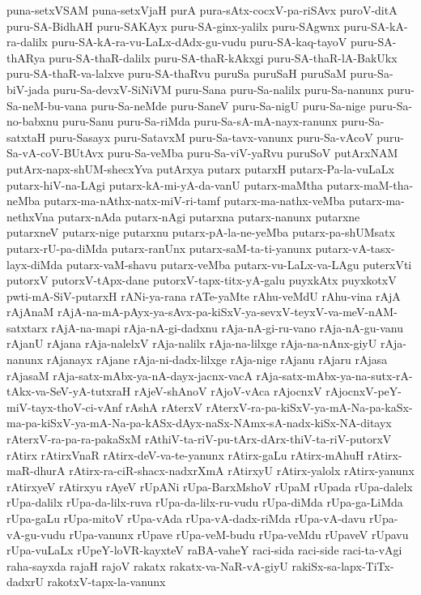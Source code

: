 {puna-setxVSAM
puna-setxVjaH
purA
pura-sAtx-cocxV-pa-riSAvx
puroV-ditA
puru-SA-BidhAH
puru-SAKAyx
puru-SA-ginx-yalilx
puru-SAgwnx
puru-SA-kA-ra-dalilx
puru-SA-kA-ra-vu-LaLx-dAdx-gu-vudu
puru-SA-kaq-tayoV
puru-SA-thARya
puru-SA-thaR-dalilx
puru-SA-thaR-kAkxgi
puru-SA-thaR-lA-BakUkx
puru-SA-thaR-va-lalxve
puru-SA-thaRvu
puruSa
puruSaH
puruSaM
puru-Sa-biV-jada
puru-Sa-devxV-SiNiVM
puru-Sana
puru-Sa-nalilx
puru-Sa-nanunx
puru-Sa-neM-bu-vana
puru-Sa-neMde
puru-SaneV
puru-Sa-nigU
puru-Sa-nige
puru-Sa-no-babxnu
puru-Sanu
puru-Sa-riMda
puru-Sa-sA-mA-nayx-ranunx
puru-Sa-satxtaH
puru-Sasayx
puru-SatavxM
puru-Sa-tavx-vanunx
puru-Sa-vAcoV
puru-Sa-vA-coV-BUtAvx
puru-Sa-veMba
puru-Sa-viV-yaRvu
puruSoV
putArxNAM
putArx-napx-shUM-shecxYva
putArxya
putarx
putarxH
putarx-Pa-la-vuLaLx
putarx-hiV-na-LAgi
putarx-kA-mi-yA-da-vanU
putarx-maMtha
putarx-maM-tha-neMba
putarx-ma-nAthx-natx-miV-ri-tamf
putarx-ma-nathx-veMba
putarx-ma-nethxVna
putarx-nAda
putarx-nAgi
putarxna
putarx-nanunx
putarxne
putarxneV
putarx-nige
putarxnu
putarx-pA-la-ne-yeMba
putarx-pa-shUMsatx
putarx-rU-pa-diMda
putarx-ranUnx
putarx-saM-ta-ti-yanunx
putarx-vA-tasx-layx-diMda
putarx-vaM-shavu
putarx-veMba
putarx-vu-LaLx-va-LAgu
puterxVti
putorxV
putorxV-tApx-dane
putorxV-tapx-titx-yA-galu
puyxkAtx
puyxkotxV
pwti-mA-SiV-putarxH
rANi-ya-rana
rATe-yaMte
rAhu-veMdU
rAhu-vina
rAjA
rAjAnaM
rAjA-na-mA-pAyx-ya-sAvx-pa-kiSxV-ya-sevxV-teyxV-va-meV-nAM-satxtarx
rAjA-na-mapi
rAja-nA-gi-dadxnu
rAja-nA-gi-ru-vano
rAja-nA-gu-vanu
rAjanU
rAjana
rAja-nalelxV
rAja-nalilx
rAja-na-lilxge
rAja-na-nAnx-giyU
rAja-nanunx
rAjanayx
rAjane
rAja-ni-dadx-lilxge
rAja-nige
rAjanu
rAjaru
rAjasa
rAjasaM
rAja-satx-mAbx-ya-nA-dayx-jacnx-vacA
rAja-satx-mAbx-ya-na-sutx-rA-tAkx-va-SeV-yA-tutxraH
rAjeV-shAnoV
rAjoV-vAca
rAjocnxV
rAjocnxV-peY-miV-tayx-thoV-ci-vAnf
rAshA
rAterxV
rAterxV-ra-pa-kiSxV-ya-mA-Na-pa-kaSx-ma-pa-kiSxV-ya-mA-Na-pa-kASx-dAyx-naSx-NAmx-sA-nadx-kiSx-NA-ditayx
rAterxV-ra-pa-ra-pakaSxM
rAthiV-ta-riV-pu-tArx-dArx-thiV-ta-riV-putorxV
rAtirx
rAtirxVnaR
rAtirx-deV-va-te-yanunx
rAtirx-gaLu
rAtirx-mAhuH
rAtirx-maR-dhurA
rAtirx-ra-ciR-shacx-nadxrXmA
rAtirxyU
rAtirx-yalolx
rAtirx-yanunx
rAtirxyeV
rAtirxyu
rAyeV
rUpANi
rUpa-BarxMshoV
rUpaM
rUpada
rUpa-dalelx
rUpa-dalilx
rUpa-da-lilx-ruva
rUpa-da-lilx-ru-vudu
rUpa-diMda
rUpa-ga-LiMda
rUpa-gaLu
rUpa-mitoV
rUpa-vAda
rUpa-vA-dadx-riMda
rUpa-vA-davu
rUpa-vA-gu-vudu
rUpa-vanunx
rUpave
rUpa-veM-budu
rUpa-veMdu
rUpaveV
rUpavu
rUpa-vuLaLx
rUpeY-loVR-kayxteV
raBA-vaheY
raci-sida
raci-side
raci-ta-vAgi
raha-sayxda
rajaH
rajoV
rakatx
rakatx-va-NaR-vA-giyU
rakiSx-sa-lapx-TiTx-dadxrU
rakotxV-tapx-la-vanunx
}
